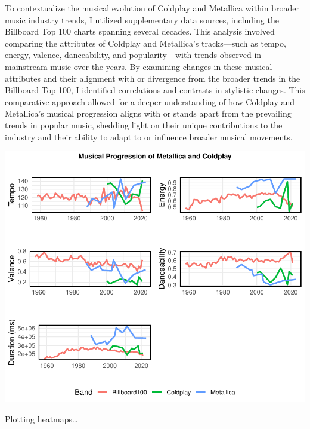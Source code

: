 \documentclass[11pt,preprint, authoryear]{elsarticle}
\let\origfigure\figure
\let\endorigfigure\endfigure
\renewenvironment{figure}[1][2] {
    \expandafter\origfigure\expandafter[H]
} {
    \endorigfigure
}
\numberwithin{equation}{section}
\numberwithin{figure}{section}
\numberwithin{table}{section}
\begin{document}
To contextualize the musical evolution of Coldplay and Metallica within
broader music industry trends, I utilized supplementary data sources,
including the Billboard Top 100 charts spanning several decades. This
analysis involved comparing the attributes of Coldplay and Metallica's
tracks---such as tempo, energy, valence, danceability, and
popularity---with trends observed in mainstream music over the years. By
examining changes in these musical attributes and their alignment with
or divergence from the broader trends in the Billboard Top 100, I
identified correlations and contrasts in stylistic changes. This
comparative approach allowed for a deeper understanding of how Coldplay
and Metallica's musical progression aligns with or stands apart from the
prevailing trends in popular music, shedding light on their unique
contributions to the industry and their ability to adapt to or influence
broader musical movements.

\begin{figure}[H]

{\centering \includegraphics{Question2_files/figure-latex/Figure3-1} 

}

\caption{Evolution of Music over time \label{Figure3}}\label{fig:Figure3}
\end{figure}

Plotting heatmaps\ldots{}
\end{document}
